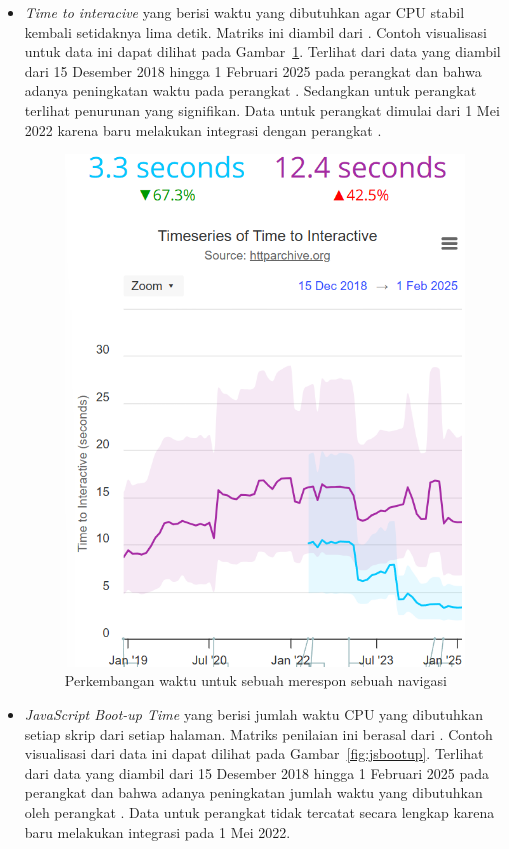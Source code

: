 \begin{itemize}
    \item \textit{Time to interacive} yang berisi waktu yang dibutuhkan agar CPU stabil kembali setidaknya lima detik. Matriks ini diambil dari \light. Contoh visualisasi untuk data ini dapat dilihat pada Gambar~\ref{fig:timeinteractive}. Terlihat dari data yang diambil dari 15 Desember 2018 hingga 1 Februari 2025 pada perangkat \desktop dan \mobile bahwa adanya peningkatan waktu pada perangkat \mobile. Sedangkan untuk perangkat \desktop terlihat penurunan yang signifikan. Data untuk perangkat \desktop dimulai dari 1 Mei 2022 karena \light baru melakukan integrasi dengan perangkat \desktop.
    \begin{figure}[H]
        \centering
        \includegraphics[width=0.4\linewidth]{Gambar/Contoh Time Interactive.png}
        \caption{Perkembangan waktu untuk sebuah \web merespon sebuah navigasi}
        \label{fig:timeinteractive}
    \end{figure}

    \item \textit{JavaScript Boot-up Time} yang berisi jumlah waktu CPU yang dibutuhkan setiap skrip dari setiap halaman. Matriks penilaian ini berasal dari \light. Contoh visualisasi dari data ini dapat dilihat pada Gambar~\ref{fig:jsbootup}. Terlihat dari data yang diambil dari 15 Desember 2018 hingga 1 Februari 2025 pada perangkat \desktop dan \mobile bahwa adanya peningkatan jumlah waktu yang dibutuhkan oleh perangkat \mobile. Data untuk perangkat \desktop tidak tercatat secara lengkap karena \light baru melakukan integrasi pada 1 Mei 2022.



\end{itemize}

